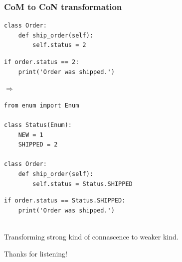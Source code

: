 \documentclass[aspectratio=169,12pt,xcolor=dvipsnames]{beamer}
\begin{document}
\begin{frame}[fragile]
  \frametitle{CoM to CoN transformation}
  \begin{center}
    \begin{minipage}[c]{.42\textwidth}
      \begin{verbatim}
class Order:
    def ship_order(self):
        self.status = 2
      \end{verbatim}
      \begin{verbatim}
if order.status == 2:
    print('Order was shipped.')
      \end{verbatim}
    \end{minipage}
    \begin{minipage}[c]{.03\textwidth}
    \begin{large}
      $\Rightarrow$
    \end{large}
    \end{minipage}
    \begin{minipage}[c]{.53\textwidth}
      \begin{verbatim}
from enum import Enum

class Status(Enum):
    NEW = 1
    SHIPPED = 2

class Order:
    def ship_order(self):
        self.status = Status.SHIPPED
      \end{verbatim}
      \begin{verbatim}
if order.status == Status.SHIPPED:
    print('Order was shipped.')
      \end{verbatim}
    \end{minipage}\medskip\\
    Transforming strong kind of connascence to weaker kind.
  \end{center}
\end{frame}

\begin{frame}
  \begin{center}
    \begin{huge}
      Thanks for listening!
    \end{huge}
  \end{center}
\end{frame}
\end{document}
